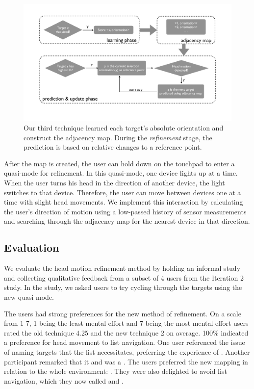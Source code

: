\begin{figure}[t]
\centering
\includegraphics[width=1\columnwidth]{figures/third_technique.pdf}
\caption{Our third technique learned each target's absolute orientation and construct the adjacency map. During the {\em refinement} stage, the prediction is based on relative changes to a reference point.}
\label{fig:third_technique}
\end{figure}

After the map is created, the user can hold down on the touchpad to enter a
quasi-mode for refinement. In this quasi-mode, one device lights up at a time. When the user turns his head in the direction of another device, the light switches to that device. Therefore, the user can move between devices one at a time with slight head movements. We implement this interaction by calculating the user's direction of motion using a low-passed history of sensor measurements and searching through the adjacency map for
the nearest device in that direction. 

\subsection{Evaluation}
We evaluate the head motion refinement method by holding an informal study and collecting qualitative feedback from a subset of 4 users from the Iteration 2 study. In the study, we asked users to try cycling through the targets using the new quasi-mode.

The users had strong preferences for the new method of refinement. On a scale from 1-7, 1 being the least mental effort and 7 being the most mental effort users rated the old technique 4.25 and the new technique 2 on average. 100\% indicated a preference for head movement to list navigation. One user referenced the issue of naming targets that the list necessitates, preferring the experience of . Another participant remarked that it  and was a . The users preferred the new mapping in relation to the whole environment: . They were also delighted to avoid list navigation, which they now called  and .
